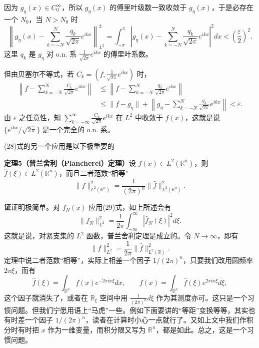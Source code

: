 因为 $g_\eta(x)\in C_0^\infty$，所以 $g_\eta(x)$ 的傅里叶级数一致收敛于 $g_\eta(x)$，于是必存在一个 $N_0$，当 $N>N_0$ 时
\[
 \left\|g_\eta(x)-\sum_{k=-N}^{N}\frac{q_k}{\sqrt{2\pi}}e^{ikx}\right\|_{L^2}^2
 =\int_{-\pi}^{\pi}\left|g_\eta(x)-\sum_{k=-N}^{N}\frac{q_k}{\sqrt{2\pi}}e^{ikx}\right|^2dx
 <\left(\frac\varepsilon2\right)^2.
\]
这里 $q_k$ 是 $g_\eta$ 对 o.n. 系 $\frac1{\sqrt{2\pi}}e^{ikx}$ 的傅里叶系数。

但由贝塞尔不等式，若 $C_k=(f,\frac1{\sqrt{2\pi}}e^{ikx})$ 时，
\[
\begin{aligned}
 \left\|f-\sum_{k=-N}^{N}\frac{C_k}{\sqrt{2\pi}}e^{ikx}\right\|
 &\le\left\|f-\sum_{k=-N}^{N}\frac{q_k}{\sqrt{2\pi}}e^{ikx}\right\|\\
 &\le\|f-g_\eta\|+
 \left\|g_\eta-\sum_{k=-N}^{N}\frac{q_k}{\sqrt{2\pi}}e^{ikx}\right\|<\varepsilon.
\end{aligned}
\]
由 $\varepsilon$ 之任意性，知 $\sum_{k=-\infty}^{\infty}\frac{C_k}{\sqrt{2\pi}}e^{ikx}$ 在 $L^2$ 中收敛于 $f(x)$，这就是说 $\{e^{ikx}/\sqrt{2\pi}\}$ 是一个完全的 o.n. 系。

(28)式的另一个应用是以下极重要的

\noindent\textbf{定理5（普兰舍利（Plancherel）定理）}\quad 设 $f(x)\in L^2(\mathbb R^n)$，则 $\widehat f(\xi)\in L^2(\mathbb R^n)$，而且二者范数“相等”
\begin{equation}
 \|f\|_{L^2(\mathbb R^n)}^2=\frac1{(2\pi)^n}\|\widehat f\|_{L^2(\mathbb R^n)}^2.
 \tag{30}
\end{equation}

\noindent\textbf{证}\quad 证明极简单。对 $f_N(x)$ 应用(29)式，如上所述会有
\[
 \|f_N\|_{L^2}^2=\frac1{2\pi}\int_{-\infty}^{\infty}|\widehat f_N(\xi)|^2d\xi.
\]
这就是说，对紧支集的 $L^2$ 函数，普兰舍利定理是成立的。令 $N\to\infty$，即有
\[
 \|f\|_{L^2}^2=\frac1{2\pi}\|\widehat f\|_{L^2(\mathbb R)}^2.
\]
定理中说二者范数“相等”，实际上相差一个因子 $1/(2\pi)^n$，只要我们改用圆频率 $2\pi\xi$，而有
\[
 \widehat f(\xi)=\int_{\mathbb R^n}f(x)e^{-2\pi ix\xi}dx,
 \qquad
 f(x)=\int_{\mathbb R^n}\widehat f(\xi)e^{2\pi ix\xi}d\xi,
\]
这个因子就消失了，或者在 $\mathbb R_\xi$ 空间中用 $\frac1{(2\pi)^n}d\xi$ 作为其测度亦可。这只是一个习惯问题。但我们宁愿用语上“马虎”一些。例如下面要讲的“等距”变换等等，其实也有时差一个因子 $1/(2\pi)^n$，读者在计算时小心一点就行了。又如上文中我们作积分时有时把 $x$ 作为一维变量，而积分限又写为 $\mathbb R^n$，都是如此。总之，这是一个习惯问题。

